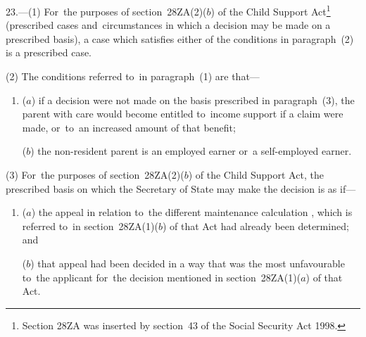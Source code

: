 \documentclass[12pt,a4paper]{article}
\begin{document}
23.—(1) For~the purposes of section~28ZA(2)($b$) of the Child Support Act\footnote{\frenchspacing Section 28ZA was inserted by section~43 of the Social Security Act 1998.} (prescribed cases and~circumstances in which a decision may be made on a prescribed basis), a case which satisfies either of the conditions in paragraph~(2) is a prescribed case.

(2) The conditions referred to~in paragraph~(1) are that—
\begin{enumerate}\item[]
($a$) if a decision were not made on the basis prescribed in paragraph~(3), the parent with care would become entitled to~income support if a claim were made, or~to~an increased amount of that benefit;

($b$) the 
non-resident parent  %
is an employed earner or~a self-employed earner.
\end{enumerate}

(3) For~the purposes of section~28ZA(2)($b$) of the Child Support Act, the prescribed basis on which the 
Secretary of State %
may make the decision is as if—
\begin{enumerate}\item[]
($a$) the appeal in relation to~the different maintenance 
calculation%
, which is referred to~in section~28ZA(1)($b$) of that Act had already been determined; and

($b$) that appeal had been decided in a way that was the most unfavourable to~the applicant for~the decision mentioned in section~28ZA(1)($a$) of that Act.
\end{enumerate}
\end{document}
